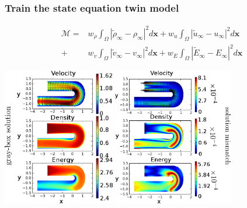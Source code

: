 \documentclass{beamer}
\begin{document}
\begin{frame}
    \frametitle{Train the state equation \hfill \scriptsize{twin model}} \small
    \scriptsize
    \vspace{-.2cm}
    \begin{equation*}\begin{split}
        \mathcal{M} = &w_\rho \int_\Omega \left|\tilde{\rho}_{\infty} - \rho_{\infty}\right|^2 d\boldsymbol{x}
                    + w_u
                    \int_\Omega \left|\tilde{u}_{\infty}- u_{\infty}\right|^2 d\boldsymbol{x} \\
                    + &w_v
                    \int_\Omega \left| \tilde{v}_{\infty}- v_{\infty}\right|^2 d\boldsymbol{x}
                    + w_E
                    \int_\Omega \left|\tilde{E}_{\infty} - E_\infty\right|^2 d\boldsymbol{x}
        \label{NS mismatch}
    \end{split}\end{equation*}
    \begin{center}
        \includegraphics[height=6cm]{graysol_Ubend.png}
        \includegraphics[height=6cm]{err_Ubend.png}
    \end{center}
\end{frame}
\end{document}
